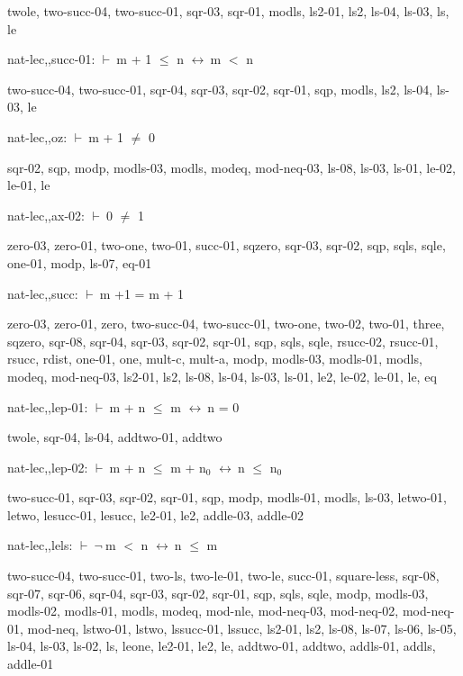 \documentclass[a4paper]{article}
\newcommand{\Fol}{\mbox{$\vdash\ $}}
\newcommand{\Not}{\mbox{$\neg\ $}}
\newcommand{\Equiv}{\mbox{$\leftrightarrow\ $}}
\begin{document}
twole, two-succ-04, two-succ-01, sqr-03, sqr-01, modls, ls2-01, ls2, ls-04, ls-03, ls, le

\bigskip

nat-lec,,succ-01: 
 \Fol m + 1 $\le$ n \Equiv m $<$ n



two-succ-04, two-succ-01, sqr-04, sqr-03, sqr-02, sqr-01, sqp, modls, ls2, ls-04, ls-03, le

\bigskip

nat-lec,,oz: 
 \Fol m + 1 $\neq$ 0



sqr-02, sqp, modp, modls-03, modls, modeq, mod-neq-03, ls-08, ls-03, ls-01, le-02, le-01, le

\bigskip

nat-lec,,ax-02: 
 \Fol 0 $\neq$ 1



zero-03, zero-01, two-one, two-01, succ-01, sqzero, sqr-03, sqr-02, sqp, sqls, sqle, one-01, modp, ls-07, eq-01

\bigskip

nat-lec,,succ: 
 \Fol m +1 = m + 1



zero-03, zero-01, zero, two-succ-04, two-succ-01, two-one, two-02, two-01, three, sqzero, sqr-08, sqr-04, sqr-03, sqr-02, sqr-01, sqp, sqls, sqle, rsucc-02, rsucc-01, rsucc, rdist, one-01, one, mult-c, mult-a, modp, modls-03, modls-01, modls, modeq, mod-neq-03, ls2-01, ls2, ls-08, ls-04, ls-03, ls-01, le2, le-02, le-01, le, eq

\bigskip

nat-lec,,lep-01: 
 \Fol m + n $\le$ m \Equiv n = 0



twole, sqr-04, ls-04, addtwo-01, addtwo

\bigskip

nat-lec,,lep-02: 
 \Fol m + n $\le$ m + $\mbox{n}_{0}$ \Equiv n $\le$ $\mbox{n}_{0}$



two-succ-01, sqr-03, sqr-02, sqr-01, sqp, modp, modls-01, modls, ls-03, letwo-01, letwo, lesucc-01, lesucc, le2-01, le2, addle-03, addle-02

\bigskip

nat-lec,,lels: 
 \Fol \Not m $<$ n \Equiv n $\le$ m



two-succ-04, two-succ-01, two-ls, two-le-01, two-le, succ-01, square-less, sqr-08, sqr-07, sqr-06, sqr-04, sqr-03, sqr-02, sqr-01, sqp, sqls, sqle, modp, modls-03, modls-02, modls-01, modls, modeq, mod-nle, mod-neq-03, mod-neq-02, mod-neq-01, mod-neq, lstwo-01, lstwo, lssucc-01, lssucc, ls2-01, ls2, ls-08, ls-07, ls-06, ls-05, ls-04, ls-03, ls-02, ls, leone, le2-01, le2, le, addtwo-01, addtwo, addls-01, addls, addle-01
\end{document}
